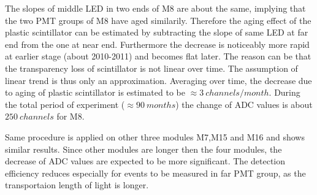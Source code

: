 The slopes of middle LED in two ends of M8 are about the same, implying that the two PMT groups of M8 have aged similarily. Therefore the aging effect of the plastic scintillator can be estimated by subtracting the slope of same LED at far end from the one at near end.
Furthermore the decrease is noticeably more rapid at earlier stage (about 2010-2011) and becomes flat later. The reason can be that the transparency loss of scintillator is not linear over time. The assumption of linear trend is thus only an approximation.
Averaging over time, the decrease due to aging of plastic scintillator is estimated to be $\approx \SI{3}{channels\per month}$.
During the total period of experiment ($\approx\SI{90}{months}$) the change of ADC values is about $\SI{250}{channels}$ for M8.

Same procedure is applied on other three modules M7,M15 and M16 and shows similar results. Since other modules are longer then the four modules, the decrease of ADC values are expected to be more significant. The detection efficiency reduces especially for events to be measured in far PMT group, as the transportaion length of light is longer.
